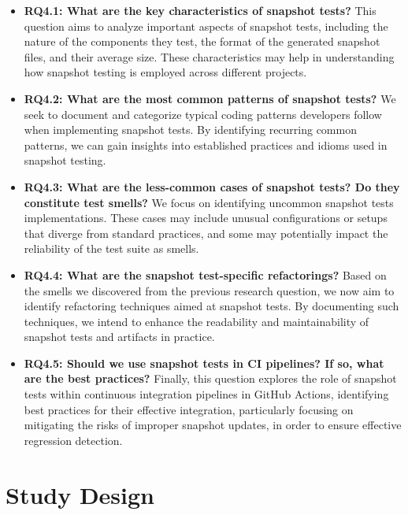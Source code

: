 \documentclass[
	msc, %
	english %
]{../ppgccufmg}
\begin{document}
        \begin{itemize}
          \item \textbf{RQ4.1: What are the key characteristics of snapshot tests?}
            This question aims to analyze important aspects of snapshot tests, including the nature of the components they test, the format of the generated snapshot files, and their average size. These characteristics may help in understanding how snapshot testing is employed across different projects.
          \item \textbf{RQ4.2: What are the most common patterns of snapshot tests?}
            We seek to document and categorize typical coding patterns developers follow when implementing snapshot tests. By identifying recurring common patterns, we can gain insights into established practices and idioms used in snapshot testing.
          \item \textbf{RQ4.3: What are the less-common cases of snapshot tests? Do they constitute test smells?}
            We focus on identifying uncommon snapshot tests implementations. These cases may include unusual configurations or setups that diverge from standard practices, and some may potentially impact the reliability of the test suite as smells.
          \item \textbf{RQ4.4: What are the snapshot test-specific refactorings?}
            Based on the smells we discovered from the previous research question, we now aim to identify refactoring techniques aimed at snapshot tests. By documenting such techniques, we intend to enhance the readability and maintainability of snapshot tests and artifacts in practice. 
          \item \textbf{RQ4.5: Should we use snapshot tests in CI pipelines? If so, what are the best practices?}
            Finally, this question explores the role of snapshot tests within continuous integration pipelines in GitHub Actions, identifying best practices for their effective integration, particularly focusing on mitigating the risks of improper snapshot updates, in order to ensure effective regression detection.\\
        \end{itemize}

         
	\section{Study Design}\label{sec:ch4-study-design}
\end{document}
